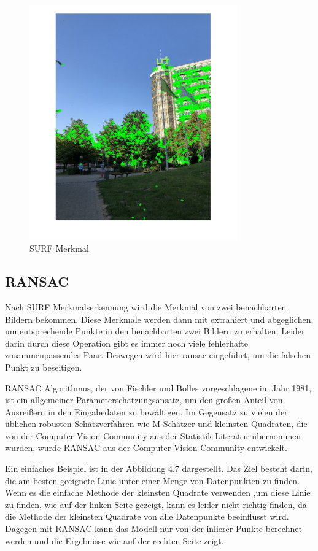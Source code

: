 \begin{figure}[H]
 \centering 
 \includegraphics[keepaspectratio,width=0.8\textwidth]{images/3_Ersteverfahren/SURF_Detektion.pdf}
 \caption{SURF Merkmal}
 \label{fig:SURF Merkmal}
\end{figure} 


\subsection{RANSAC}

Nach SURF Merkmalserkennung wird die Merkmal von zwei benachbarten Bildern bekommen. Diese Merkmale werden dann mit extrahiert und abgeglichen, um entsprechende Punkte in den benachbarten zwei Bildern zu erhalten. Leider darin durch diese Operation gibt es immer noch viele fehlerhafte zusammenpassendes Paar. Deswegen wird hier \gls{ransac} eingeführt, um die falschen Punkt zu beseitigen.

RANSAC Algorithmus, der von Fischler und Bolles \cite{ransac1} vorgeschlagene im Jahr 1981, ist ein allgemeiner Parameterschätzungsansatz, um den großen Anteil von Ausreißern in den Eingabedaten zu bewältigen. Im Gegensatz zu vielen der üblichen robusten Schätzverfahren wie M-Schätzer und kleinsten Quadraten, die von der Computer Vision Community aus der Statistik-Literatur übernommen wurden, wurde RANSAC aus der Computer-Vision-Community entwickelt. 

Ein einfaches Beispiel ist in der Abbildung 4.7 dargestellt. Das Ziel besteht darin, die am besten geeignete Linie unter einer Menge von Datenpunkten zu finden. Wenn es die einfache Methode der kleinsten Quadrate verwenden ,um diese Linie zu finden, wie auf der linken Seite gezeigt, kann es leider nicht richtig finden, da die Methode der kleinsten Quadrate von alle Datenpunkte beeinflusst wird. Dagegen mit RANSAC kann das Modell nur von der inlierer Punkte berechnet werden und die Ergebnisse wie auf der rechten Seite zeigt. 

